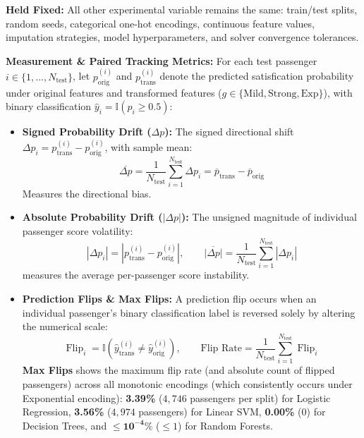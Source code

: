 \documentclass[10pt,a4paper]{article}
\begin{document}
\textbf{Held Fixed:} All other experimental variable remains the same: train/test splits, random seeds, categorical one-hot encodings, continuous feature values, imputation strategies, model hyperparameters, and solver convergence tolerances.

\textbf{Measurement \& Paired Tracking Metrics:} For each test passenger $i \in \{1, \dots, N_{\text{test}}\}$, let $p_{\text{orig}}^{(i)}$ and $p_{\text{trans}}^{(i)}$ denote the predicted satisfication probability under original features  and  transformed features ($g \in \{\text{Mild}, \text{Strong}, \text{Exp}\}$), with binary classification $\hat{y}_i = \mathbb{I}(p_i \ge 0.5)$:
\begin{itemize}[leftmargin=1.2em]
    \item \textbf{Signed Probability Drift ($\Delta p$):} The signed directional shift $\Delta p_i = p_{\text{trans}}^{(i)} - p_{\text{orig}}^{(i)}$, with sample mean:
    \begin{equation}
        \overline{\Delta p} = \frac{1}{N_{\text{test}}} \sum_{i=1}^{N_{\text{test}}} \Delta p_i = \overline{p}_{\text{trans}} - \overline{p}_{\text{orig}}
    \end{equation}
    Measures the directional bias. 
    \item \textbf{Absolute Probability Drift ($|\Delta p|$):} The unsigned magnitude of individual passenger score volatility:
    \begin{equation}
        |\Delta p_i| = \left| p_{\text{trans}}^{(i)} - p_{\text{orig}}^{(i)} \right|, \qquad \overline{|\Delta p|} = \frac{1}{N_{\text{test}}} \sum_{i=1}^{N_{\text{test}}} |\Delta p_i|
    \end{equation}
    measures the average per-passenger score instability. 
    \item \textbf{Prediction Flips \& Max Flips:} A prediction flip occurs when an individual passenger's binary classification label is reversed solely by altering the numerical scale:
    \begin{equation}
        \operatorname{Flip}_i = \mathbb{I}\left(\hat{y}_{\text{trans}}^{(i)} \ne \hat{y}_{\text{orig}}^{(i)}\right), \qquad \text{Flip Rate} = \frac{1}{N_{\text{test}}} \sum_{i=1}^{N_{\text{test}}} \operatorname{Flip}_i
    \end{equation}
    \textbf{Max Flips} shows the maximum flip rate (and absolute count of flipped passengers) across all monotonic encodings (which consistently occurs under Exponential encoding): \textbf{3.39\%} ($4{,}746$ passengers per split) for Logistic Regression, \textbf{3.56\%} ($4{,}974$ passengers) for Linear SVM, \textbf{0.00\%} ($0$) for Decision Trees, and $\le \mathbf{10^{-4}\%}$ ($\le 1$) for Random Forests.
\end{itemize}
\end{document}
